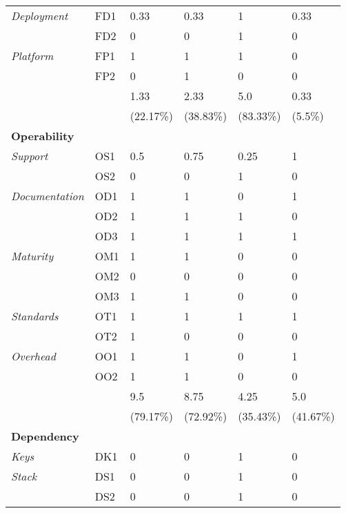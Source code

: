 \begin{longtable}{@{\extracolsep{\fill}}llllll@{}}
        \textit{Deployment}    & FD1 & 0.33 & 0.33 & 1 & 0.33 \\
                               & FD2 & 0 & 0 & 1 & 0 \\
        \textit{Platform}      & FP1 & 1 & 1 & 1 & 0 \\
                               & FP2 & 0 & 1 & 0 & 0 \\
                               \hline
                               && 1.33 & 2.33 & 5.0 & 0.33 \\
                               && (22.17\%) & (38.83\%) & (83.33\%) & (5.5\%) \\
                               \midrule
        \textbf{Operability} &&&&&\\
        \textit{Support}       & OS1 & 0.5 & 0.75 & 0.25 & 1 \\
                               & OS2 & 0 & 0 & 1 & 0 \\
        \textit{Documentation} & OD1 & 1 & 1 & 0 & 1 \\
                               & OD2 & 1 & 1 & 1 & 0 \\
                               & OD3 & 1 & 1 & 1 & 1 \\
        \textit{Maturity}      & OM1 & 1 & 1 & 0 & 0 \\
                               & OM2 & 0 & 0 & 0 & 0 \\
                               & OM3 & 1 & 1 & 0 & 0 \\
        \textit{Standards}     & OT1 & 1 & 1 & 1 & 1 \\
                               & OT2 & 1 & 0 & 0 & 0 \\
        \textit{Overhead}      & OO1 & 1 & 1 & 0 & 1 \\
                               & OO2 & 1 & 1 & 0 & 0 \\
                               \hline
                               && 9.5 & 8.75 & 4.25 & 5.0 \\
                               && (79.17\%) & (72.92\%) & (35.43\%) & (41.67\%) \\
                               \midrule
        \textbf{Dependency} &&&&&\\
        \textit{Keys}          & DK1 & 0 & 0 & 1 & 0 \\
        \textit{Stack}         & DS1 & 0 & 0 & 1 & 0 \\
                               & DS2 & 0 & 0 & 1 & 0 \\                       

\end{longtable}
